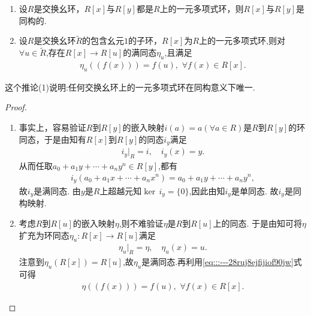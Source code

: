 \documentclass[../../main.tex]{subfiles}%
\begin{document}
\begin{corollary}\label{corollary:同一个环生成的一元多项式环必同构}
\begin{enumerate}[(1)]
\item\label{corollary:同一个环生成的一元多项式环必同构-1} 设$R$是交换幺环，$R[x]$与$R[y]$都是$R$上的一元多项式环，则$R[x]$与$R[y]$是同构的.

\item\label{corollary:同一个环生成的一元多项式环必同构-2} 设$R$是交换幺环$\widetilde{R}$的包含幺元$1$的子环，$R[x]$为$R$上的一元多项式环,则对$\forall u\in \widetilde{R}$,存在$R[x]\to R[u]$的满同态$\eta_u$,且满足
\begin{align*}
\eta_u((f(x)))=f(u),\,\,\forall f(x)\in R[x].
\end{align*}
\end{enumerate}
\end{corollary}
\begin{note}
这个推论(1)说明:任何交换幺环上的一元多项式环在同构意义下唯一.
\end{note}
\begin{proof}
\begin{enumerate}[(1)]
\item 事实上，容易验证$R$到$R[y]$的嵌入映射$i(a)=a(\forall a\in R)$是$R$到$R[y]$的环同态，于是由知有$R[x]$到$R[y]$的同态$i_y$满足
\begin{align*}
i_y|_R=i,\quad i_y(x)=y.
\end{align*}
从而任取$a_0+a_1y+\cdots+a_ny^n\in R[y]$,都有
\begin{align*}
i_y(a_0+a_1x+\cdots+a_nx^n)=a_0+a_1y+\cdots+a_ny^n,
\end{align*}
故$i_y$是满同态. 由$y$是$R$上超越元知$\ker\,i_y=\{0\}$,因此由知$i_y$是单同态. 故$i_y$是同构映射.

\item 考虑$R$到$R[u]$的嵌入映射$\eta$,则不难验证$\eta$是$R$到$R[u]$上的同态. 于是由知可将$\eta$扩充为环同态$\eta_u:R[x]\to R[u]$满足
\begin{align}\label{eq:::---28ruj8ejfijiof90jw}
\eta_u|_R=\eta,\quad \eta_u(x)=u.
\end{align}
注意到$\eta_u(R[x])=R[u]$,故$\eta_u$是满同态.再利用\eqref{eq:::---28ruj8ejfijiof90jw}式可得
\begin{align*}
\eta((f(x)))=f(u),\,\,\forall f(x)\in R[x].
\end{align*}
\end{enumerate}

\end{proof}
\end{document}
